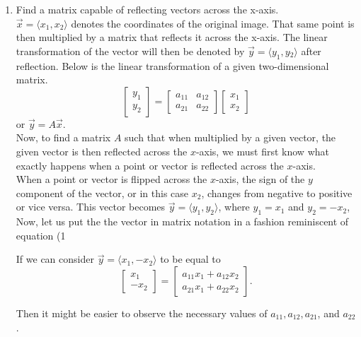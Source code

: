 \documentclass{ximera}
\begin{document}
\begin{enumerate}
    \item Find a matrix capable of reflecting vectors across the x-axis. \\
    
    $\vec{x} = \langle{x{_1}},x{_2}\rangle$ denotes the coordinates of the original image. That same point is then multiplied by a matrix that reflects it across the x-axis. The linear transformation of the vector will then be denoted by 
$\vec{y} = \langle{y_{1}},y{_2}\rangle$ after reflection. Below is the linear transformation of a given two-dimensional matrix.
$$\left[\begin{array}{c}
y_{1}\\ y_{2}\end{array} \right]=\left[\begin{array}{cc}
a_{11} & a_{12} \\ a_{21} & a_{22} \end{array}\right]\left[\begin{array}{c} x_1 \\ x_2\end{array}\right]$$ or $\vec{y} = A\vec{x}$.\\

Now, to find a matrix $A$ such that when multiplied by a given vector, the given vector is then reflected across the $x$-axis, we must first know what exactly happens when a point or vector is reflected across the $x$-axis.\\

When a point or vector is flipped across the $x$-axis, the sign of the $y$ component of the vector, or in this case $x_2$, changes from negative to positive or vice versa. This vector becomes $\vec{y} = \langle{y_1}, y_2\rangle$, where $y_1 = x_1$ and $y_2 =-x_2$,\\

Now, let us put the the vector in matrix notation in a fashion reminiscent of equation (1

If we can consider $\vec{y} = \langle{x_1},-x_2\rangle$ to be equal to $$\left[\begin{array}{c} x_1 \\ -x_2\end{array}\right] = \left[\begin{array}{c} a_{11}x_1 + a_{12}x_2\\a_{21}x_1 + a_{22} x_2\end{array}\right].$$ 

Then it might be easier to observe the necessary values of $a_{11},a_{12},a_{21}$, and $a_{22}$.\\


\end{enumerate}
\end{document}
